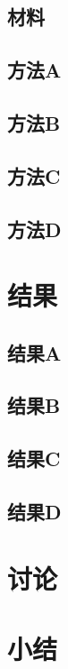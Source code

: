 \subsection{材料}
\Blindtext

\subsection{方法A}
\Blindtext

\subsection{方法B}
\Blindtext

\subsection{方法C}
\Blindtext

\subsection{方法D}
\Blindtext

\section{结果}
\subsection{结果A}
\Blindtext

\subsection{结果B}
\Blindtext

\subsection{结果C}
\Blindtext

\subsection{结果D}
\Blindtext

\section{讨论}
\Blindtext

\section{小结}
\Blindtext 